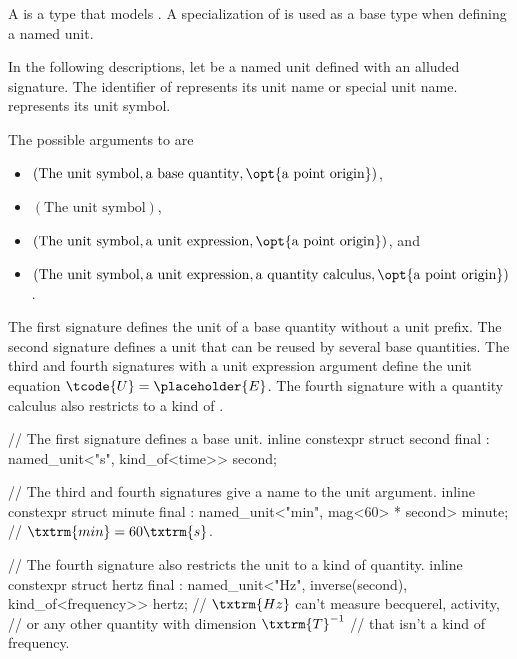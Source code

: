 \pnum
A  is a type that models .
A specialization of  is used as a base type when defining a named unit.

\pnum
In the following descriptions, let  be a named unit defined with an alluded signature.
The identifier of  represents
its unit name
or special unit name.
 represents its unit symbol.

\pnum
The possible arguments to  are
\begin{itemize}
\item
$(\text{The unit symbol}, \text{a base quantity}, \opt{\text{a point origin}})$,
\item
$(\text{The unit symbol})$,
\item
$(\text{The unit symbol}, \text{a unit expression}, \opt{\text{a point origin}})$, and
\item
$(\text{The unit symbol}, \text{a unit expression}, \text{a quantity calculus}, \opt{\text{a point origin}})$.
\end{itemize}

\pnum
The first signature defines the unit of a base quantity
without a unit prefix.
The second signature defines a unit
that can be reused by several base quantities.
The third and fourth signatures with a unit expression argument 
define the unit equation $\tcode{U} = \placeholder{E}$.
The fourth signature with a quantity calculus 
also restricts  to a kind of .

\pnum
\begin{example}
\begin{codeblock}
// The first signature defines a base unit.
inline constexpr struct second final : named_unit<"s", kind_of<time>> {
} second;

// The third and fourth signatures give a name to the unit argument.
inline constexpr struct minute final : named_unit<"min", mag<60> * second> {
} minute;  // $\txtrm{min} = 60 \txtrm{ s}$.

// The fourth signature also restricts the unit to a kind of quantity.
inline constexpr struct hertz final : named_unit<"Hz", inverse(second), kind_of<frequency>> {
} hertz;  // $\txtrm{Hz}$ can't measure becquerel, activity,
          // or any other quantity with dimension $\txtrm{T}^{-1}$
          // that isn't a kind of frequency.
\end{codeblock}
\end{example}

